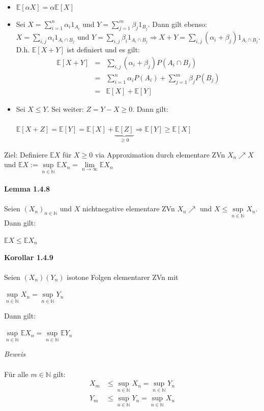 \documentclass[10pt,a4paper]{report}
\numberwithin{equation}{section}
\numberwithin{figure}{section}
\theoremstyle{plain}
\theoremstyle{definition}
\theoremstyle{plain}
\theoremstyle{definition}
\theoremstyle{remark}
\theoremstyle{plain}
\begin{document}
\begin{itemize}
\item $\mathbb{E}[\alpha X]=\alpha \mathbb{E}[X]$
\item Sei $X=\sum\limits_{i=1}^n\alpha_i 1_{A_i}$ und $Y=\sum\limits_{j=1}^m\beta_j1_{B_j}$. Dann gilt ebenso: $X=\sum\limits_{i,j}\alpha_i1_{A_i\cap B_j}$ und $Y=\sum\limits_{i,j}\beta_i1_{A_i\cap B_j} \Rightarrow X+Y=\sum\limits_{i,j}(\alpha_i+\beta_j)1_{A_i\cap B_j}$. D.h. $\mathbb{E}[X+Y]$ ist definiert und es gilt:
\begin{eqnarray*}
\mathbb{E}[X+Y]&=& \sum\limits_{i,j}(\alpha_i+\beta_j)P(A_i\cap B_j)\\
&=&\sum\limits_{i=1}^n\alpha_i P(A_i)+\sum\limits_{j=1}^m\beta_jP(B_j)\\
&=&\mathbb{E}[X]+\mathbb{E}[Y]
\end{eqnarray*} 
\item Sei $X\leq Y$. Sei weiter: $Z=Y-X\geq 0$. Dann gilt:\\\\
$\mathbb{E}[X+Z]=\mathbb{E}[Y]=\mathbb{E}[X]+\underbrace{\mathbb{E}[Z]}_{\geq 0} \Rightarrow \mathbb{E}[Y]\geq \mathbb{E}[X]$
\end{itemize}
Ziel: Definiere $\mathbb{E}X$ für $X\geq 0$ via Approximation durch elementare ZVn $X_n\nearrow X$ und $\mathbb{E}X:=\sup\limits_{n\in \mathbb{N}}\mathbb{E}X_n=\lim\limits_{n\to \infty} \mathbb{E}X_n$\\\\
\textbf{Lemma 1.4.8}\\\\
Seien $(X_n)_{n\in \mathbb{N}}$ und $X$ nichtnegative elementare ZVn $X_n\nearrow$ und $X\leq \sup\limits_{n\in \mathbb{N}} X_n$. Dann gilt:
\begin{center}
$\mathbb{E}X\leq \mathbb{E}X_n$ 
\end{center} 
\textbf{Korollar 1.4.9}\\\\
Seien $(X_n)(Y_n)$ isotone Folgen elementarer ZVn mit 
\begin{center}
$\sup\limits_{n\in \mathbb{N}} X_n=\sup\limits_{n\in \mathbb{N}} Y_n$
\end{center}
Dann gilt:
\begin{center}
$\sup\limits_{n\in \mathbb{N}}\mathbb{E} X_n=\sup\limits_{n\in \mathbb{N}}\mathbb{E} Y_n$
\end{center}
\textit{Beweis}\\\\
Für alle $m\in \mathbb{N}$ gilt:
\begin{eqnarray*}
X_m&\leq\sup\limits_{n\in \mathbb{N}} X_n=\sup\limits_{n\in \mathbb{N}} Y_n\\
Y_m&\leq\sup\limits_{n\in \mathbb{N}} Y_n=\sup\limits_{n\in \mathbb{N}} X_n
\end{eqnarray*}
\end{document}
